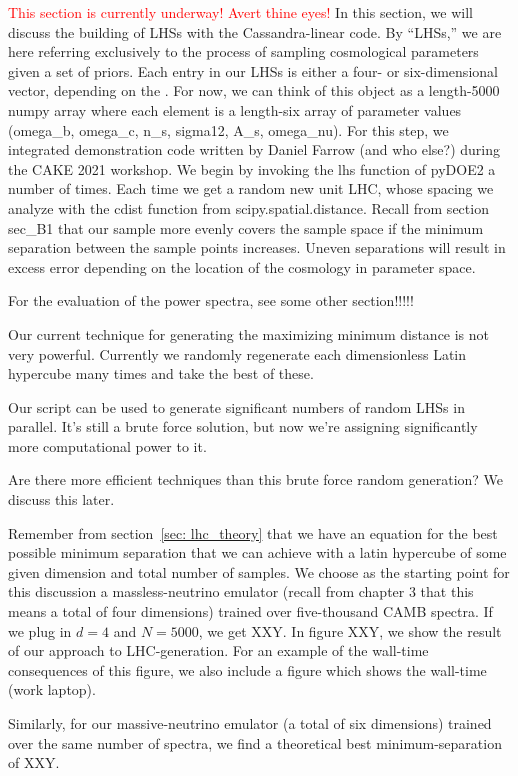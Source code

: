 \textcolor{red}{This section is currently underway! Avert thine eyes!}
In this section, we will discuss the building of LHSs with the
Cassandra-linear code. By ``LHSs,'' we are here referring exclusively to the
process of sampling cosmological parameters given a set of priors. Each entry
in our LHSs is either a four- or six-dimensional vector, depending on the
. For now, we can think of this object as a length-5000 numpy array where each element is a length-six array of parameter values (omega_b, omega_c, n_s, sigma12, A_s, omega_nu). For this step, we integrated demonstration code written by Daniel Farrow (and who else?) during the CAKE 2021 workshop. We begin by invoking the lhs function of pyDOE2 a number of times. Each time we get a random new unit LHC, whose spacing we analyze with the cdist function from scipy.spatial.distance.  Recall from section sec_B1 that our sample more evenly covers the sample space if the minimum separation between the sample points increases. Uneven separations will result in excess error depending on the location of the cosmology in parameter space.


For the evaluation of the power spectra, see some other section!!!!!



Our current technique for generating the  maximizing minimum distance is not very powerful.
Currently we randomly regenerate each dimensionless Latin hypercube many
times and take the best of these.

Our script can be used to generate significant numbers of random LHSs in
parallel. It’s still a brute force solution, but now we’re assigning
significantly more computational power to it.

Are there more efficient techniques than this brute force random generation?
We discuss this later. 

Remember from section~\ref{sec: lhc_theory} that we have an equation for the
best possible minimum separation that we can achieve with a latin hypercube
of some given dimension and total number of samples. We choose as the starting
point for this discussion a massless-neutrino emulator (recall from chapter 3
that this means a total of four dimensions) trained over five-thousand CAMB
spectra. If we plug in $d = 4$ and $N=5000$, we get XXY. In figure XXY, we
show the result of our approach to LHC-generation. For an example of the
wall-time consequences of this figure, we also include a figure which shows
the wall-time (work laptop).

Similarly, for our massive-neutrino emulator (a total of six dimensions)
trained over the same number of spectra, we find a theoretical best
minimum-separation of XXY. 

